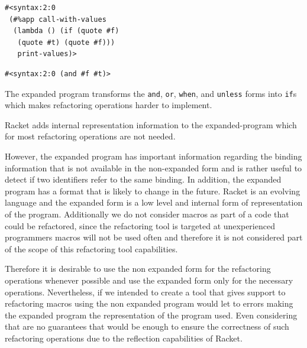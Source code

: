 \begin{lstlisting}[basicstyle=\ttfamily, caption="Expanded program"]
#<syntax:2:0
 (#%app call-with-values
  (lambda () (if (quote #f)
   (quote #t) (quote #f)))
   print-values)>
\end{lstlisting}

\begin{lstlisting}[basicstyle=\ttfamily, caption="Non-expanded program"]
#<syntax:2:0 (and #f #t)>
\end{lstlisting}


The expanded program transforms the {\tt and}, {\tt or}, {\tt when}, and {\tt unless} forms into
{\tt if}s which makes refactoring operations harder to implement.

Racket adds internal representation information to the expanded-program which for
most refactoring operations are not needed.

However, the expanded program has important information regarding the binding
information that is not available in the non-expanded form and is rather useful
to detect if two identifiers refer to the same binding.
In addition, the expanded program has a format that is likely to change
in the future.
Racket is an evolving language and the expanded form is a low level and internal
form of representation of the program.
Additionally we do not consider macros as part of a code that could be refactored,
 since the refactoring tool is targeted at unexperienced programmers macros
will not be used often and therefore it is not considered part of the scope of
this refactoring tool capabilities.

Therefore it is desirable to use the non expanded form for the refactoring %
operations whenever possible and use the expanded form only for the necessary
operations.
Nevertheless, if we intended to create a tool that gives support to refactoring macros
using the non expanded program would let to errors making the expanded program the
representation of the program used.
Even considering that are no guarantees that would be enough to ensure the correctness of
such refactoring operations due to the reflection capabilities of Racket.


